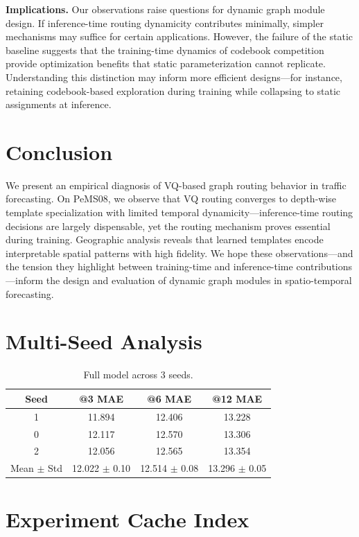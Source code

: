 \documentclass[journal]{IEEEtran}
\begin{document}
\textbf{Implications.} Our observations raise questions for dynamic graph module design. If inference-time routing dynamicity contributes minimally, simpler mechanisms may suffice for certain applications. However, the failure of the static baseline suggests that the training-time dynamics of codebook competition provide optimization benefits that static parameterization cannot replicate. Understanding this distinction may inform more efficient designs---for instance, retaining codebook-based exploration during training while collapsing to static assignments at inference.

\section{Conclusion}

We present an empirical diagnosis of VQ-based graph routing behavior in traffic forecasting. On PeMS08, we observe that VQ routing converges to depth-wise template specialization with limited temporal dynamicity---inference-time routing decisions are largely dispensable, yet the routing mechanism proves essential during training. Geographic analysis reveals that learned templates encode interpretable spatial patterns with high fidelity. We hope these observations---and the tension they highlight between training-time and inference-time contributions---inform the design and evaluation of dynamic graph modules in spatio-temporal forecasting.

\appendix

\section{Multi-Seed Analysis}

\begin{table}[h]
\centering
\caption{Full model across 3 seeds.}
\begin{tabular}{cccc}
\toprule
Seed & @3 MAE & @6 MAE & @12 MAE \\
\midrule
1 & 11.894 & 12.406 & 13.228 \\
0 & 12.117 & 12.570 & 13.306 \\
2 & 12.056 & 12.565 & 13.354 \\
\midrule
Mean $\pm$ Std & 12.022 $\pm$ 0.10 & 12.514 $\pm$ 0.08 & 13.296 $\pm$ 0.05 \\
\bottomrule
\end{tabular}
\end{table}

\section{Experiment Cache Index}
\end{document}
